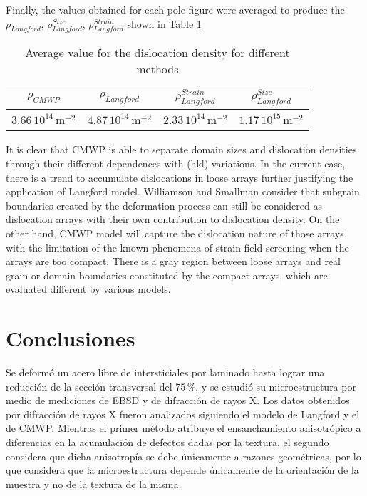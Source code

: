 Finally, the values obtained for each pole figure were averaged to produce the $\rho_{Langford}$, $\rho_{Langford}^{Size}$, $\rho_{Langford}^{Strain}$ shown in Table \ref{tab:rhocomp}


\begin{table}[h!]
\centering
\caption{Average value for the dislocation density for different methods}
\label{tab:rhocomp}
\begin{tabular}{|c|c|c|c|}
  \hline
  \rowcolor[HTML]{CBCEFB} 
  $\rho_{CMWP}$  & $\rho_{Langford}$ &  $\rho_{Langford}^{Strain}$ &  $\rho_{Langford}^{Size}$ \\ \hline
  $3.66 \, 10^{14}$\,m$^{-2}$ & $4.87 \, 10^{14}$\,m$^{-2}$ & $2.33 \, 10^{14}$\,m$^{-2}$ & $1.17 \, 10^{15}$\,m$^{-2}$ \\ \hline
  \end{tabular}
\end{table}

It is clear that CMWP is able to separate domain sizes and dislocation densities through their different dependences with (hkl) variations. In the current case, there is a trend to accumulate dislocations in loose arrays further justifying the application of Langford model. Williamson and Smallman consider that subgrain boundaries created by the deformation process can still be considered as dislocation arrays with their own contribution to dislocation density. On the other hand, CMWP model will capture the dislocation nature of those arrays with the limitation of the known phenomena of strain field screening when the arrays are too compact. There is a gray region between loose arrays and real grain or domain boundaries constituted by the compact arrays, which are evaluated different by various models.

\section{Conclusiones}\label{S:IFConclusiones}
Se deformó un acero libre de intersticiales por laminado hasta lograr una reducción de la sección transversal del 75\,\%, y se estudió su microestructura por medio de mediciones de EBSD y de difracción de rayos X.
Los datos obtenidos por difracción de rayos X fueron analizados siguiendo el modelo de Langford y el de CMWP.
Mientras el primer método atribuye el ensanchamiento anisotrópico a diferencias en la acumulación de defectos dadas por la textura, el segundo considera que dicha anisotropía se debe únicamente a razones geométricas, por lo que considera que la microestructura depende únicamente de la orientación de la muestra y no de la textura de la misma.

